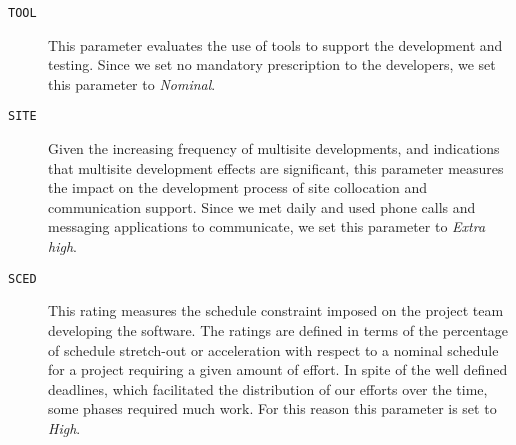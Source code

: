 \begin{description}
	\item [\normalfont\texttt{TOOL}] This parameter evaluates the use of tools to support the development and testing. Since we set no mandatory prescription to the developers, we set this parameter to \emph{Nominal}.

	\item [\normalfont\texttt{SITE}] Given the increasing frequency of multisite developments, and indications that multisite development effects are significant, this parameter measures the impact on the development process of site collocation and communication support. Since we met daily and used phone calls and messaging applications to communicate, we set this parameter to \emph{Extra high}.

	\item [\normalfont\texttt{SCED}] This rating measures the schedule constraint imposed on the project team developing the software. The ratings are defined in terms of the percentage of schedule stretch-out or acceleration with respect to a nominal schedule for a project requiring a given amount of effort. In spite of the well defined deadlines, which facilitated the distribution of our efforts over the time, some phases required much work. For this reason this parameter is set to \emph{High}.

\end{description}
